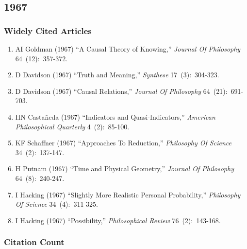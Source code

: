 \documentclass[
  10pt,
  letterpaper,
  DIV=11,
  numbers=noendperiod,
  twoside]{scrartcl}
\providecommand{\tightlist}{%
  \setlength{\itemsep}{0pt}\setlength{\parskip}{0pt}}\usepackage{longtable,booktabs,array}
\begin{document}
\newpage

\subsection{1967}\label{sec-s1967}

\subsubsection*{Widely Cited Articles}\label{widely-cited-articles-10}

\begin{enumerate}
\def\labelenumi{\arabic{enumi}.}
\tightlist
\item
  AI Goldman (1967) ``A Causal Theory of Knowing,'' \emph{Journal Of
  Philosophy} 64~(12):~357-372.
\item
  D Davidson (1967) ``Truth and Meaning,'' \emph{Synthese}
  17~(3):~304-323.
\item
  D Davidson (1967) ``Causal Relations,'' \emph{Journal Of Philosophy}
  64~(21):~691-703.
\item
  HN Castañeda (1967) ``Indicators and Quasi-Indicators,''
  \emph{American Philosophical Quarterly} 4~(2):~85-100.
\item
  KF Schaffner (1967) ``Approaches To Reduction,'' \emph{Philosophy Of
  Science} 34~(2):~137-147.
\item
  H Putnam (1967) ``Time and Physical Geometry,'' \emph{Journal Of
  Philosophy} 64~(8):~240-247.
\item
  I Hacking (1967) ``Slightly More Realistic Personal Probability,''
  \emph{Philosophy Of Science} 34~(4):~311-325.
\item
  I Hacking (1967) ``Possibility,'' \emph{Philosophical Review}
  76~(2):~143-168.
\end{enumerate}

\subsubsection*{Citation Count}\label{sec-count-1967}
\end{document}
